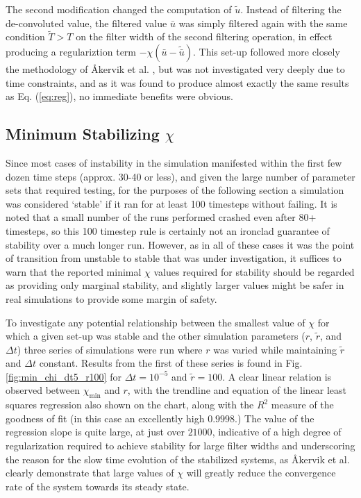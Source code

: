 The second modification changed the computation of $\tilde{u}$. Instead of filtering the de-convoluted value, the filtered value $\bar{u}$ was simply filtered again with the same condition $\tilde{T}>T$ on the filter width of the second filtering operation, in effect producing a regulariztion term $-\chi(\bar{u}-\tilde{\bar{u}})$. This set-up followed more closely the methodology of \AA kervik et al. \cite{Akervik2006}, but was not investigated very deeply due to time constraints, and as it was found to produce almost exactly the same results as Eq. (\ref{eq:reg}), no immediate benefits were obvious.

\subsection{Minimum Stabilizing $\chi$}

Since most cases of instability in the simulation manifested within the first few dozen time steps (approx. 30-40 or less), and given the large number of parameter sets that required testing, for the purposes of the following section a simulation was considered `stable' if it ran for at least 100 timesteps without failing. It is noted that a small number of the runs performed crashed even after 80+ timesteps, so this 100 timestep rule is certainly not an ironclad guarantee of stability over a much longer run. However, as in all of these cases it was the point of transition from unstable to stable that was under investigation, it suffices to warn that the reported minimal $\chi$ values required for stability should be regarded as providing only marginal stability, and slightly larger values might be safer in real simulations to provide some margin of safety.

To investigate any potential relationship between the smallest value of $\chi$ for which a given set-up was stable and the other simulation parameters ($r$, $\tilde{r}$, and $\Delta t$) three series of simulations were run where $r$ was varied while maintaining $\tilde{r}$ and $\Delta t$ constant. Results from the first of these series is found in Fig. \ref{fig:min_chi_dt5_r100} for $\Delta t=10^{-5}$ and $\tilde{r}=100$. A clear linear relation is observed between $\chi_{\mathrm{min}}$ and $r$, with the trendline and equation of the linear least squares regression also shown on the chart, along with the $R^2$ measure of the goodness of fit (in this case an excellently high $0.9998$.) The value of the regression slope is quite large, at just over $21000$, indicative of a high degree of regularization required to achieve stability for large filter widths and underscoring the reason for the slow time evolution of the stabilized systems, as \AA kervik et al. \cite{Akervik2006} clearly demonstrate that large values of $\chi$ will greatly reduce the convergence rate of the system towards its steady state.

